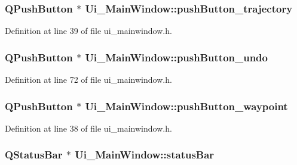 \subsubsection[{\texorpdfstring{push\+Button\+\_\+trajectory}{pushButton_trajectory}}]{\setlength{\rightskip}{0pt plus 5cm}Q\+Push\+Button $\ast$ Ui\+\_\+\+Main\+Window\+::push\+Button\+\_\+trajectory}\hypertarget{class_ui___main_window_ade777d3fea8e356a341eba1ce6dd242e}{}\label{class_ui___main_window_ade777d3fea8e356a341eba1ce6dd242e}


Definition at line 39 of file ui\+\_\+mainwindow.\+h.

\subsubsection[{\texorpdfstring{push\+Button\+\_\+undo}{pushButton_undo}}]{\setlength{\rightskip}{0pt plus 5cm}Q\+Push\+Button $\ast$ Ui\+\_\+\+Main\+Window\+::push\+Button\+\_\+undo}\hypertarget{class_ui___main_window_a6df2acb67c3fb9088719f7746fc4e39b}{}\label{class_ui___main_window_a6df2acb67c3fb9088719f7746fc4e39b}


Definition at line 72 of file ui\+\_\+mainwindow.\+h.

\subsubsection[{\texorpdfstring{push\+Button\+\_\+waypoint}{pushButton_waypoint}}]{\setlength{\rightskip}{0pt plus 5cm}Q\+Push\+Button $\ast$ Ui\+\_\+\+Main\+Window\+::push\+Button\+\_\+waypoint}\hypertarget{class_ui___main_window_ae474025a1640cbb55bec3205474f0a1f}{}\label{class_ui___main_window_ae474025a1640cbb55bec3205474f0a1f}


Definition at line 38 of file ui\+\_\+mainwindow.\+h.

\subsubsection[{\texorpdfstring{status\+Bar}{statusBar}}]{\setlength{\rightskip}{0pt plus 5cm}Q\+Status\+Bar $\ast$ Ui\+\_\+\+Main\+Window\+::status\+Bar}\hypertarget{class_ui___main_window_afa919f3af6f2f526a70f1fa331f63724}{}\label{class_ui___main_window_afa919f3af6f2f526a70f1fa331f63724}


